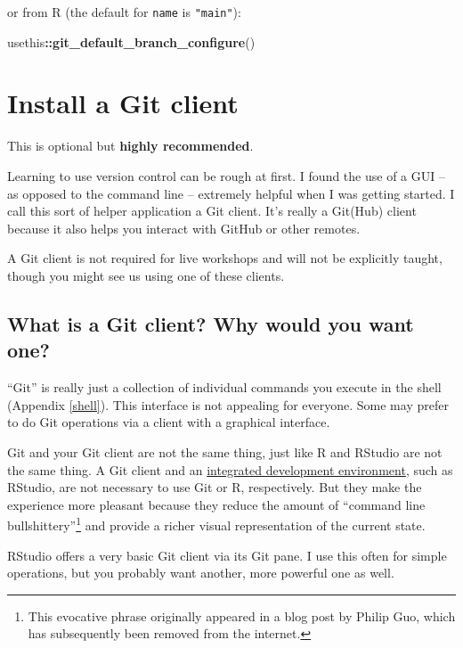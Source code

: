 \documentclass[
]{book}
\newenvironment{Shaded}{\begin{snugshade}}{\end{snugshade}}
\newcommand{\FunctionTok}[1]{\textcolor[rgb]{0.13,0.29,0.53}{\textbf{#1}}}
\newcommand{\NormalTok}[1]{#1}
\newcommand{\SpecialCharTok}[1]{\textcolor[rgb]{0.81,0.36,0.00}{\textbf{#1}}}
\begin{document}
or from R (the default for \texttt{name} is \texttt{"main"}):

\begin{Shaded}
\begin{Highlighting}[]
\NormalTok{usethis}\SpecialCharTok{::}\FunctionTok{git\_default\_branch\_configure}\NormalTok{()}
\end{Highlighting}
\end{Shaded}

\chapter{Install a Git client}\label{git-client}

This is optional but \textbf{highly recommended}.

Learning to use version control can be rough at first. I found the use of a GUI -- as opposed to the command line -- extremely helpful when I was getting started. I call this sort of helper application a Git client. It's really a Git(Hub) client because it also helps you interact with GitHub or other remotes.

A Git client is not required for live workshops and will not be explicitly taught, though you might see us using one of these clients.

\section{What is a Git client? Why would you want one?}\label{what-is-a-git-client-why-would-you-want-one}

``Git'' is really just a collection of individual commands you execute in the shell (Appendix \ref{shell}). This interface is not appealing for everyone. Some may prefer to do Git operations via a client with a graphical interface.

Git and your Git client are not the same thing, just like R and RStudio are not the same thing. A Git client and an \href{https://en.wikipedia.org/wiki/Integrated_development_environment}{integrated development environment}, such as RStudio, are not necessary to use Git or R, respectively. But they make the experience more pleasant because they reduce the amount of ``command line bullshittery''\footnote{This evocative phrase originally appeared in a blog post by Philip Guo, which has subsequently been removed from the internet.} and provide a richer visual representation of the current state.

RStudio offers a very basic Git client via its Git pane. I use this often for simple operations, but you probably want another, more powerful one as well.
\end{document}
